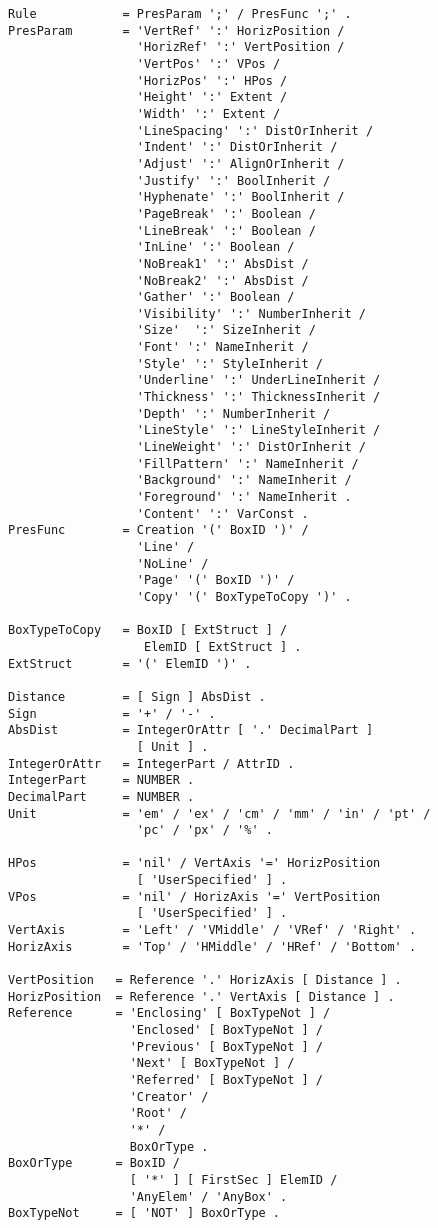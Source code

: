 \begin{verbatim}
Rule            = PresParam ';' / PresFunc ';' .
PresParam       = 'VertRef' ':' HorizPosition /
                  'HorizRef' ':' VertPosition /
                  'VertPos' ':' VPos /
                  'HorizPos' ':' HPos /
                  'Height' ':' Extent /
                  'Width' ':' Extent /
                  'LineSpacing' ':' DistOrInherit /
                  'Indent' ':' DistOrInherit /
                  'Adjust' ':' AlignOrInherit /
                  'Justify' ':' BoolInherit /
                  'Hyphenate' ':' BoolInherit /
                  'PageBreak' ':' Boolean /
                  'LineBreak' ':' Boolean /
                  'InLine' ':' Boolean /
                  'NoBreak1' ':' AbsDist /
                  'NoBreak2' ':' AbsDist /
                  'Gather' ':' Boolean /
                  'Visibility' ':' NumberInherit /
                  'Size'  ':' SizeInherit /
                  'Font' ':' NameInherit /
                  'Style' ':' StyleInherit /
                  'Underline' ':' UnderLineInherit /
                  'Thickness' ':' ThicknessInherit /
                  'Depth' ':' NumberInherit /
                  'LineStyle' ':' LineStyleInherit /
                  'LineWeight' ':' DistOrInherit /
                  'FillPattern' ':' NameInherit /
                  'Background' ':' NameInherit /
                  'Foreground' ':' NameInherit .
                  'Content' ':' VarConst .
PresFunc        = Creation '(' BoxID ')' /
                  'Line' /
                  'NoLine' /
                  'Page' '(' BoxID ')' /
                  'Copy' '(' BoxTypeToCopy ')' .

BoxTypeToCopy   = BoxID [ ExtStruct ] /
                   ElemID [ ExtStruct ] .
ExtStruct       = '(' ElemID ')' .

Distance        = [ Sign ] AbsDist .
Sign            = '+' / '-' .
AbsDist         = IntegerOrAttr [ '.' DecimalPart ]
                  [ Unit ] .
IntegerOrAttr   = IntegerPart / AttrID .
IntegerPart     = NUMBER .
DecimalPart     = NUMBER .
Unit            = 'em' / 'ex' / 'cm' / 'mm' / 'in' / 'pt' /
                  'pc' / 'px' / '%' .

HPos            = 'nil' / VertAxis '=' HorizPosition 
                  [ 'UserSpecified' ] .
VPos            = 'nil' / HorizAxis '=' VertPosition 
                  [ 'UserSpecified' ] .
VertAxis        = 'Left' / 'VMiddle' / 'VRef' / 'Right' .
HorizAxis       = 'Top' / 'HMiddle' / 'HRef' / 'Bottom' .

VertPosition   = Reference '.' HorizAxis [ Distance ] .
HorizPosition  = Reference '.' VertAxis [ Distance ] .
Reference      = 'Enclosing' [ BoxTypeNot ] /
                 'Enclosed' [ BoxTypeNot ] /
                 'Previous' [ BoxTypeNot ] /
                 'Next' [ BoxTypeNot ] /
                 'Referred' [ BoxTypeNot ] /
                 'Creator' /
                 'Root' /
                 '*' /
                 BoxOrType .
BoxOrType      = BoxID /
                 [ '*' ] [ FirstSec ] ElemID /
                 'AnyElem' / 'AnyBox' .
BoxTypeNot     = [ 'NOT' ] BoxOrType .


\end{verbatim}
